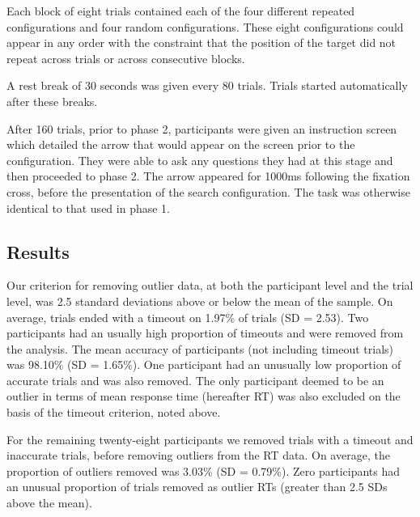 \documentclass[
  man,
  floatsintext,
  longtable,
  nolmodern,
  notxfonts,
  notimes,
  colorlinks=true,linkcolor=blue,citecolor=blue,urlcolor=blue]{apa7}
\begin{document}
Each block of eight trials contained each of the four different repeated
configurations and four random configurations. These eight
configurations could appear in any order with the constraint that the
position of the target did not repeat across trials or across
consecutive blocks.

A rest break of 30 seconds was given every 80 trials. Trials started
automatically after these breaks.

After 160 trials, prior to phase 2, participants were given an
instruction screen which detailed the arrow that would appear on the
screen prior to the configuration. They were able to ask any questions
they had at this stage and then proceeded to phase 2. The arrow appeared
for 1000ms following the fixation cross, before the presentation of the
search configuration. The task was otherwise identical to that used in
phase 1.

\subsection{Results}\label{results}

Our criterion for removing outlier data, at both the participant level
and the trial level, was 2.5 standard deviations above or below the mean
of the sample. On average, trials ended with a timeout on 1.97\% of
trials (SD = 2.53). Two participants had an usually high proportion of
timeouts and were removed from the analysis. The mean accuracy of
participants (not including timeout trials) was 98.10\% (SD = 1.65\%).
One participant had an unusually low proportion of accurate trials and
was also removed. The only participant deemed to be an outlier in terms
of mean response time (hereafter RT) was also excluded on the basis of
the timeout criterion, noted above.

For the remaining twenty-eight participants we removed trials with a
timeout and inaccurate trials, before removing outliers from the RT
data. On average, the proportion of outliers removed was 3.03\% (SD =
0.79\%). Zero participants had an unusual proportion of trials removed
as outlier RTs (greater than 2.5 SDs above the mean).
\end{document}
